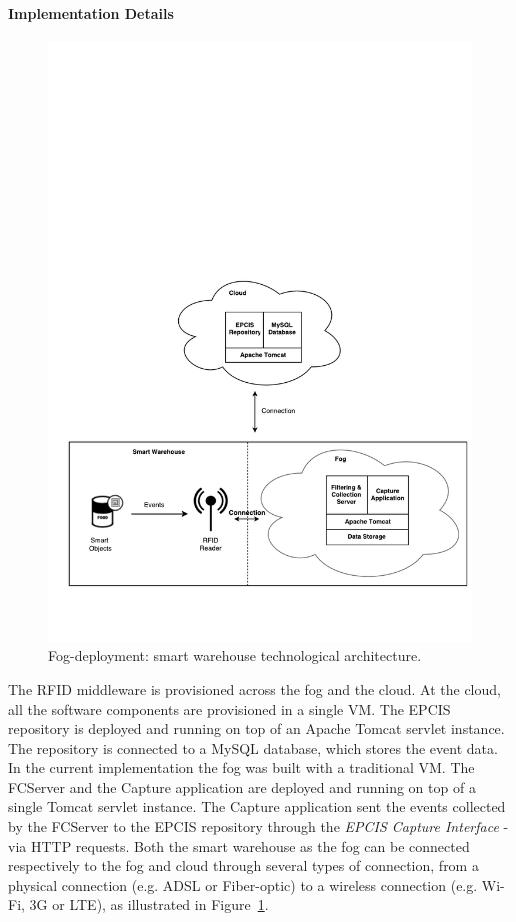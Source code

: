 \paragraph{Implementation Details}
\label{par:imp_smart_warehouse_fog}

\begin{figure}[ht!]
\centering
\includegraphics[width=.5\textwidth]{./figures/implementation_fog_architecture}
\caption{Fog-deployment: smart warehouse technological architecture.}
\label{fig:implementation_fog_architecture}
\end{figure}

The \gls{RFID} middleware is provisioned across the fog and the cloud. At the cloud,
all the software components are provisioned in a single \gls{VM}. The \gls{EPCIS} repository is deployed
and running on top of an Apache Tomcat servlet instance. The repository is connected to a MySQL
database, which stores the event data. In the current implementation the fog was built with a traditional
\gls{VM}. The \gls{FCServer} and the Capture application are deployed and running on top of a single
Tomcat servlet instance. The Capture application sent the events collected by the \gls{FCServer} to
the \gls{EPCIS} repository through the \textit{\gls{EPCIS} Capture Interface} - via \gls{HTTP} requests.
Both the smart warehouse as the fog can be connected respectively to the fog and cloud through several
types of connection, from a physical connection (e.g. \gls{ADSL} or Fiber-optic) to a wireless connection
(e.g. Wi-Fi, 3G or \gls{LTE}), as illustrated in Figure~\ref{fig:implementation_fog_architecture}. 
